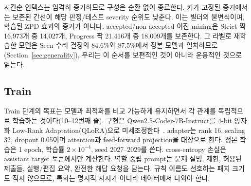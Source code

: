\documentclass[10pt,conference]{IEEEtran}
\begin{document}
시간순 인덱스는 엄격히 증가하므로 구성은 순환 없이 종료한다. 키가 고정된 증거에서는 보존된 간선이 해당 판정/테스트 severity 순위도 낮춘다. 이는 빌더의 불변식이며, 학습된 ZPD 효과의 증거가 아니다. accepted/non-accepted 이진 mining은 Strict 짝 16,973개 중 14,027개, Progress 짝 21,416개 중 18,009개를 보존한다. 그 라벨로 재학습한 모델은 Seen 수리 결정의 84.6\%와 87.5\%에서 정본 모델과 일치하므로(Section~\ref{sec:generality}), 우리는 이 순서를 보편적인 것이 아니라 운용적인 것으로 읽는다.

\subsection{Train}
\label{sec:train}
Train 단계의 목표는 모델과 최적화를 비교 가능하게 유지하면서 각 관계를 독립적으로 학습하는 것이다(10--12번째 줄). 구현은 Qwen2.5-Coder-7B-Instruct를 4-bit 양자화 Low-Rank Adaptation(QLoRA)으로 미세조정한다~\cite{hui2024qwen2,dettmers2023qlora}. adapter는 rank 16, scaling 32, dropout 0.05이며 attention과 feed-forward projection을 대상으로 한다. 정본 학습은 1 epoch, 학습률 \(2\times10^{-4}\), seed 2027--2029를 쓴다. cross-entropy 손실은 assistant target 토큰에서만 계산한다. 역할 중립 prompt는 문제 설명, 제한, 허용된 제출들, 실행/편집 요약, 완전한 해답 요청을 담는다. 규칙 이름도 선호하는 패치 크기도 적지 않으므로, 특화는 명시적 지시가 아니라 데이터에서 나와야 한다.
\end{document}
